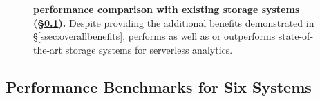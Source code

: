 \begin{figure}
  \centering
  \caption[\jiffy performance comparison with existing storage systems]{\small{\textbf{\jiffy performance comparison with existing storage systems (\S\ref{ssec:hrelated}).} Despite providing the additional benefits demonstrated in \S\ref{ssec:overallbenefits}, \jiffy performs as well as or outperforms state-of-the-art storage systems for serverless analytics.}}
  \label{fig:storage-perf}
\end{figure}

\subsection{Performance Benchmarks for Six Systems}
\label{ssec:hrelated}

